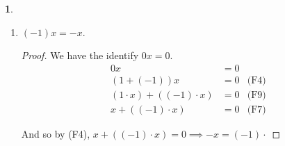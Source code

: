 \documentclass[12pt, letterpaper]{article}
\theoremstyle{definition} %
\newtheorem{problem}[theorem]{}
\begin{document}
\begin{problem}
\begin{enumerate}[label={\bfseries{(\alph{*})}}]
        \item $(-1)x = -x$.
            \begin{proof}
                 We have the identify $0x = 0$.
            \begin{align*}
                0x &= 0 \\
                (1 + (-1))x & = 0  &\text{(F4)}\\
                (1 \cdot x) + ((-1)\cdot x) & = 0  &\text{(F9)} \\
                x + ((-1) \cdot x) & = 0           &\text{(F7)}  
            \end{align*}

                And so by (F4), $x+((-1) \cdot x) = 0  \implies -x = (-1) \cdot$
            \end{proof}
    \end{enumerate}
\end{problem}
\end{document}
